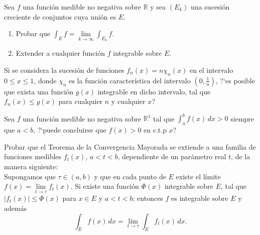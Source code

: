 \documentclass{book}
\newcommand{\rr}{\mathbb{R}}
\begin{document}
  \begin{ejer}{} 
  Sea $f$ una función medible no negativa sobre $\rr$ y sea $(E_k)$ una sucesión creciente de conjuntos
  cuya unión es $E$.
	\begin{enumerate}
  \item Probar que $\int_{E} f=\lim\limits_{k \rightarrow \infty} \int_{E_k} f$.
  \item Extender a cualquier función $f$ integrable sobre $E$.
	\end{enumerate}
	\end{ejer}

  

  \begin{ejer}{}
	Si se considera la sucesión de funciones $f_n(x)=n \chi_n(x)$ en el intervalo $0\leq x\leq 1$,
  donde $\chi_n$ es la función característica del intervalo $\left(0,\frac{1}{n}\right)$, ?`es posible que exista
  una función $g(x)$ integrable en dicho intervalo, tal que $f_n(x) \leq g(x)$ para cualquier $n$ y cualquier
  $x$?
	\end{ejer}


  
  \begin{ejer}{} 
	Sea $f$ una función medible no negativa sobre $\rr^1$ tal que $\int_a^b f(x)\,dx>0$ siempre
  que $a<b$, ?`puede concluirse que $f(x)>0$ en c.t.p $x$?
	\end{ejer}
 
	
  \begin{ejer}{} 
  Probar que el Teorema de la Convergencia Mayorada se extiende a una familia de funciones medibles $f_t(x)$,\;  
  $a<t<b$, dependiente de un parámetro real $t$, de la manera siguiente:
   \\
   Supongamos que $\tau \in (a,b)$ y que en cada punto de $E$ existe el límite 
   $f(x)=\lim\limits_{t \rightarrow \tau} f_t(x)$.
   Si existe una función $\Phi(x)$ integrable sobre $E$, tal que $|f_t(x)|\leq \Phi(x)$ para $x \in E$ y $a<t<b$;
   entonces $f$ es integrable sobre $E$ y además 
   $$\int_E f(x)\,dx=\lim_{t \rightarrow \tau}\int_E f_t(x)\,dx. $$
	\end{ejer}
	
\end{document}
